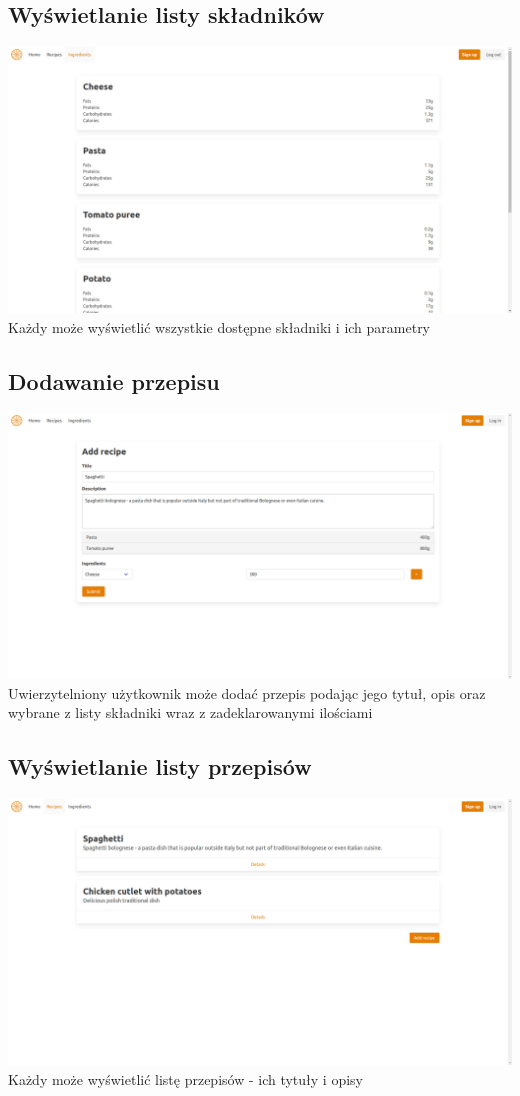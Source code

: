 \documentclass[11pt]{article}
\begin{document}
\subsection{Wyświetlanie listy składników}
\includegraphics[width=15.5cm]{ingredients_list.png}
\newline
Każdy może wyświetlić wszystkie dostępne składniki i ich parametry
\subsection{Dodawanie przepisu}
\includegraphics[width=15.5cm]{add_recipe.png}
\newline
Uwierzytelniony użytkownik może dodać przepis podając jego tytuł, opis oraz wybrane z listy składniki wraz z zadeklarowanymi ilościami
\subsection{Wyświetlanie listy przepisów}
\includegraphics[width=15.5cm]{list_of_recipes.png}
\newline
Każdy może wyświetlić listę przepisów - ich tytuły i opisy
\end{document}
